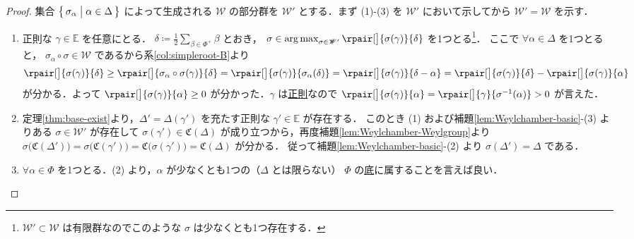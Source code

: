 \documentclass[rep_main]{subfiles}
\begin{document}
\begin{proof}
	集合 $\bigl\{\, \sigma_\alpha \bigm| \alpha \in \Delta \,\bigr\}$ によって生成される $\mathscr{W}$ の部分群を $\mathscr{W}'$ とする．まず (1)-(3) を $\mathscr{W}'$ において示してから $\mathscr{W}' = \mathscr{W}$ を示す．
	\begin{enumerate}
		\item 正則な $\gamma \in \mathbb{E}$ を任意にとる．
		$\delta \coloneqq \frac{1}{2} \sum_{\beta \in \Phi^+} \beta$ とおき，
		$\sigma \in \argmax_{\sigma \in \mathscr{W}'} \rpair[\big]{\sigma(\gamma)}{\delta}$
		を1つとる\footnote{$\mathscr{W}' \subset \mathscr{W}$ は有限群なのでこのような $\sigma$ は少なくとも1つ存在する．}．
		ここで $\forall \alpha \in \Delta$ を1つとると， 
		$\sigma_\alpha \circ \sigma \in \mathscr{W}$ であるから系\ref{col:simpleroot-B}より
		\begin{align}
			\rpair[\big]{\sigma(\gamma)}{\delta} \ge \rpair[\big]{\sigma_\alpha\circ \sigma(\gamma)}{\delta} = \rpair[\big]{\sigma(\gamma)}{\sigma_\alpha(\delta)} = \rpair[\big]{\sigma(\gamma)}{\delta - \alpha} = \rpair[\big]{\sigma(\gamma)}{\delta} - \rpair[\big]{\sigma(\gamma)}{\alpha}
		\end{align}
		が分かる．よって $\rpair[\big]{\sigma(\gamma)}{\alpha} \ge 0$ が分かった．$\gamma$ は\hyperref[def:decomposable]{正則}なので $\rpair[\big]{\sigma(\gamma)}{\alpha} = \rpair[\big]{\gamma}{\sigma^{-1}(\alpha)} > 0$ が言えた．
		\item 定理\ref{thm:base-exist}より，$\Delta' = \Delta(\gamma')$ を充たす正則な $\gamma' \in \mathbb{E}$ が存在する．
		このとき (1) および補題\ref{lem:Weylchamber-basic}-(3) よりある $\sigma \in \mathscr{W}'$ が存在して $\sigma (\gamma') \in \mathfrak{C}(\Delta)$ が成り立つから，再度補題\ref{lem:Weylchamber-Weylgroup}より $\sigma \bigl( \mathfrak{C}(\Delta') \bigr) = \sigma \bigl(\mathfrak{C}(\gamma')\bigr) = \mathfrak{C} \bigl( \sigma(\gamma') \bigr) = \mathfrak{C}(\Delta)$ が分かる．
		従って補題\ref{lem:Weylchamber-basic}-(2) より $\sigma(\Delta') = \Delta$ である．
		\item $\forall \alpha \in \Phi$ を1つとる．(2) より，$\alpha$ が少なくとも1つの（$\Delta$ とは限らない） $\Phi$ の\hyperref[def:base-root]{底}に属することを言えば良い．
		

\end{enumerate}
\end{proof}
\end{document}
